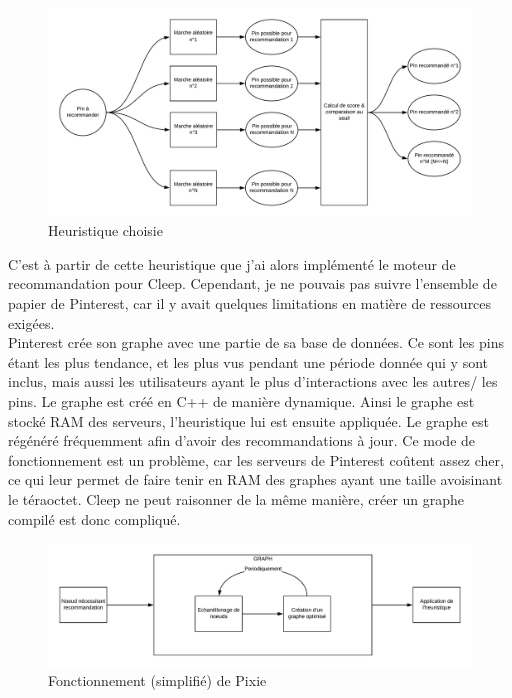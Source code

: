 \documentclass{article} %
\begin{document}
\begin{figure}[!h]
 \centering
 \includegraphics[keepaspectratio = true,scale=0.7]{procpint.png}
 \caption{Heuristique choisie}
 \label{fig:procpint}
\end{figure}

C'est à partir de cette heuristique que j'ai alors implémenté le moteur de recommandation pour Cleep. Cependant, je ne pouvais pas suivre l'ensemble de papier de Pinterest, car il y avait quelques limitations en matière de ressources exigées.\\
Pinterest crée son graphe avec une partie de sa base de données. Ce sont les pins étant les plus tendance, et les plus vus pendant une période donnée qui y sont inclus, mais aussi les utilisateurs ayant le plus d'interactions avec les autres/ les pins. Le graphe est créé en C++ de manière dynamique. Ainsi le graphe est stocké RAM des serveurs, l'heuristique lui est ensuite appliquée. Le graphe est régénéré fréquemment afin d'avoir des recommandations à jour. Ce mode de fonctionnement est un problème, car les serveurs de Pinterest coûtent assez cher, ce qui leur permet de faire tenir en RAM des graphes ayant une taille avoisinant le téraoctet. Cleep ne peut raisonner de la même manière, créer un graphe compilé est donc compliqué. \\

\begin{figure}[!h]
 \centering
 \includegraphics[keepaspectratio = true,scale=0.7]{pintfunc.png}
 \caption{Fonctionnement (simplifié) de Pixie}
 \label{fig:funcpint}
\end{figure}
\end{document}
